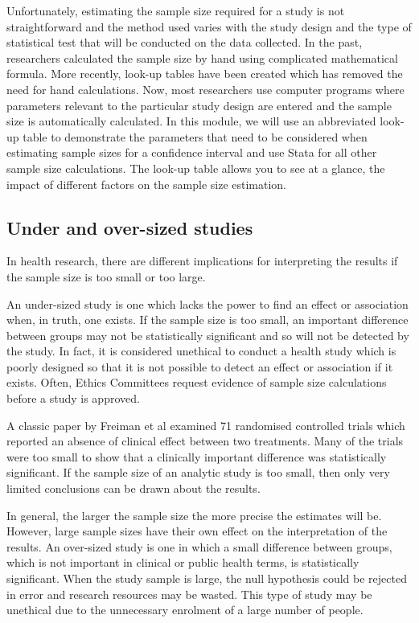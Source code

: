 \documentclass[
]{memoir}
\begin{document}
Unfortunately, estimating the sample size required for a study is not straightforward and the method used varies with the study design and the type of statistical test that will be conducted on the data collected. In the past, researchers calculated the sample size by hand using complicated mathematical formula. More recently, look-up tables have been created which has removed the need for hand calculations. Now, most researchers use computer programs where parameters relevant to the particular study design are entered and the sample size is automatically calculated. In this module, we will use an abbreviated look-up table to demonstrate the parameters that need to be considered when estimating sample sizes for a confidence interval and use Stata for all other sample size calculations. The look-up table allows you to see at a glance, the impact of different factors on the sample size estimation.

\hypertarget{under-and-over-sized-studies}{%
\subsection{Under and over-sized studies}\label{under-and-over-sized-studies}}

In health research, there are different implications for interpreting the results if the sample size is too small or too large.

An under-sized study is one which lacks the power to find an effect or association when, in truth, one exists. If the sample size is too small, an important difference between groups may not be statistically significant and so will not be detected by the study. In fact, it is considered unethical to conduct a health study which is poorly designed so that it is not possible to detect an effect or association if it exists. Often, Ethics Committees request evidence of sample size calculations before a study is approved.

A classic paper by Freiman et al examined 71 randomised controlled trials which reported an absence of clinical effect between two treatments.\citep{freiman_etal78a} Many of the trials were too small to show that a clinically important difference was statistically significant. If the sample size of an analytic study is too small, then only very limited conclusions can be drawn about the results.

In general, the larger the sample size the more precise the estimates will be. However, large sample sizes have their own effect on the interpretation of the results. An over-sized study is one in which a small difference between groups, which is not important in clinical or public health terms, is statistically significant. When the study sample is large, the null hypothesis could be rejected in error and research resources may be wasted. This type of study may be unethical due to the unnecessary enrolment of a large number of people.
\end{document}
